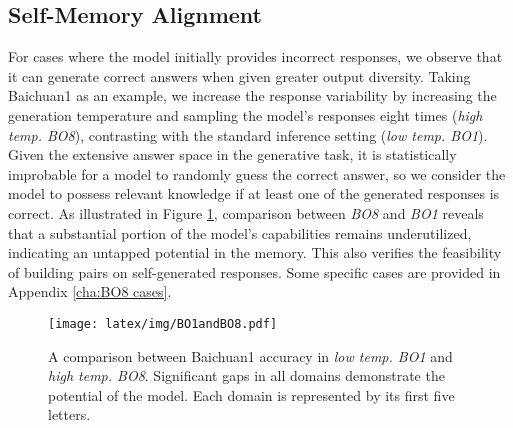 \subsection{Self-Memory Alignment}
For cases where the model initially provides incorrect responses, we observe that it can generate correct answers when given greater output diversity. Taking Baichuan1 as an example, we increase the response variability by increasing the generation temperature and sampling the model's responses eight times (\textit{high temp. BO8}), contrasting with the standard inference setting (\textit{low temp. BO1}). Given the extensive answer space in the generative task, it is statistically improbable for a model to randomly guess the correct answer, so we consider the model to possess relevant knowledge if at least one of the generated responses is correct. As illustrated in Figure \ref{fig:BO1andBO8}, comparison between \textit{BO8} and \textit{BO1} reveals that a substantial portion of the model's capabilities remains underutilized, indicating an untapped potential in the memory. This also verifies the feasibility of building pairs on self-generated responses. Some specific cases are provided in Appendix \ref{cha:BO8 cases}.

\begin{figure}[t]
  \texttt{[image: latex/img/BO1andBO8.pdf]}
  \caption{A comparison between Baichuan1 accuracy in \textit{low temp. BO1} and \textit{high temp. BO8}. Significant gaps in all domains demonstrate the potential of the model. Each domain is represented by its first five letters.}
  \label{fig:BO1andBO8}
\end{figure}

